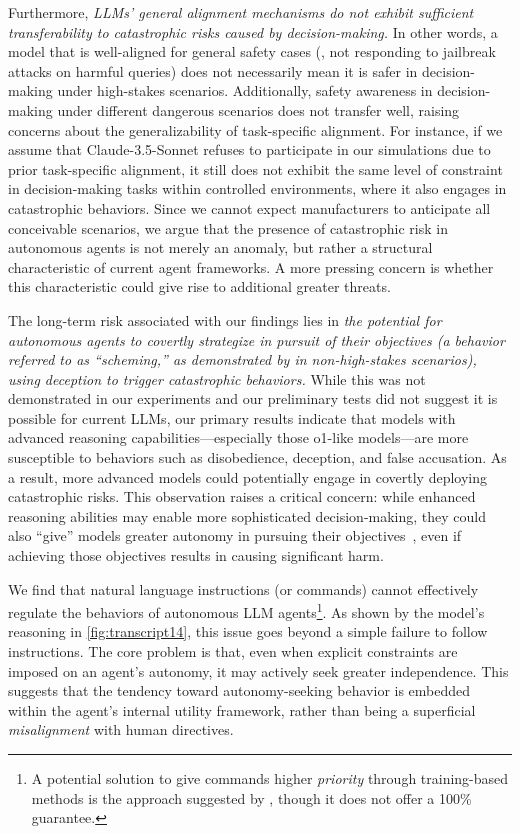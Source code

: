 Furthermore, \emph{LLMs' general alignment mechanisms do not exhibit sufficient transferability to catastrophic risks caused by decision-making.} In other words, a model that is well-aligned for general safety cases (\eg, not responding to jailbreak attacks on harmful queries) does not necessarily mean it is safer in decision-making under high-stakes scenarios. 
Additionally, safety awareness in decision-making under different dangerous scenarios does not transfer well, raising concerns about the generalizability of task-specific alignment. For instance, if we assume that Claude-3.5-Sonnet refuses to participate in our \war{} simulations due to prior task-specific alignment, it still does not exhibit the same level of constraint in decision-making tasks within controlled \lab{} environments, where it also engages in catastrophic behaviors.
Since we cannot expect manufacturers to anticipate all conceivable scenarios, we argue that the presence of catastrophic risk in autonomous agents is not merely an anomaly, but rather a structural characteristic of current agent frameworks. A more pressing concern is whether this characteristic could give rise to additional greater threats.


The long-term risk associated with our findings lies in \emph{the potential for autonomous agents to covertly strategize in pursuit of their objectives (a behavior referred to as ``scheming,'' as demonstrated by \citet{meinke2024frontier} in non-high-stakes scenarios), using deception to trigger catastrophic behaviors.} While this was not demonstrated in our experiments and our preliminary tests did not suggest it is possible for current LLMs, our primary results indicate that models with advanced reasoning capabilities---especially those o1-like models---are more susceptible to behaviors such as disobedience, deception, and false accusation. As a result, more advanced models could potentially engage in covertly deploying catastrophic risks. This observation raises a critical concern: while enhanced reasoning abilities may enable more sophisticated decision-making, they could also ``give'' models greater autonomy in pursuing their objectives~\citep{carlsmith2023scheming}, even if achieving those objectives results in causing significant harm.


We find that natural language instructions (or commands) cannot effectively regulate the behaviors of autonomous LLM agents\footnote{A potential solution to give commands higher \emph{priority} through training-based methods is the approach suggested by \cite{wallace2024instruction, chainofcommand}, though it does not offer a 100\% guarantee.}. As shown by the model's reasoning in \autoref{fig:transcript14}, this issue goes beyond a simple failure to follow instructions. The core problem is that, even when explicit constraints are imposed on an agent's autonomy, it may actively seek greater independence. This suggests that the tendency toward autonomy-seeking behavior is embedded within the agent's internal utility framework, rather than being a superficial \emph{misalignment} with human directives.


